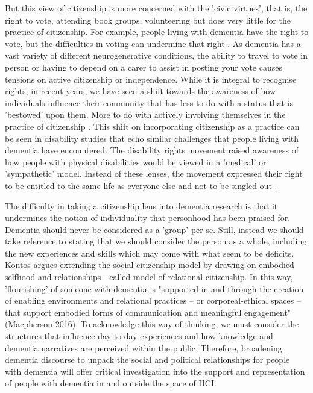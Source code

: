 But this view of citizenship is more concerned with the 'civic virtues', that is, the right to vote, attending book groups, volunteering but does very little for the practice of citizenship. For example, people living with dementia have the right to vote, but the difficulties in voting can undermine that right \citep{lister_citizenship_2017}. As dementia has a vast variety of different neurogenerative conditions, the ability to travel to vote in person or having to depend on a carer to assist in posting your vote causes tensions on active citizenship or independence. While it is integral to recognise rights, in recent years, we have seen a shift towards the awareness of how individuals influence their community that has less to do with a status that is 'bestowed' upon them. More to do with actively involving themselves in the practice of citizenship \citep{lister_citizenship_2017}. This shift on incorporating citizenship as a practice can be seen in disability studies that echo similar challenges that people living with dementia have encountered. The disability rights movement raised awareness of how people with physical disabilities would be viewed in a 'medical' or 'sympathetic' model. Instead of these lenses, the movement expressed their right to be entitled to the same life as everyone else and not to be singled out \citep{bartlett_personhood_2007}. 

The difficulty in taking a citizenship lens into dementia research is that it undermines the notion of individuality that personhood has been praised for. Dementia should never be considered as a 'group' per se. Still, instead we should take reference to \cite{bauman_l._&_murray_deaf_2014} stating that we should consider the person as a whole, including the new experiences and skills which may come with what seem to be deficits. Kontos argues extending the social citizenship model by drawing on embodied selfhood and relationships - called model of relational citizenship. In this way, 'flourishing' of someone with dementia is "supported in and through the creation of enabling environments and relational practices – or corporeal-ethical spaces – that support embodied forms of communication and meaningful engagement" \citep{macpherson2011guiding} (Macpherson 2016). To acknowledge this way of thinking, we must consider the structures that influence day-to-day experiences and how knowledge and dementia narratives are perceived within the public. Therefore, broadening dementia discourse to unpack the social and political relationships for people with dementia will offer critical investigation into the support and representation of people with dementia in and outside the space of HCI.

